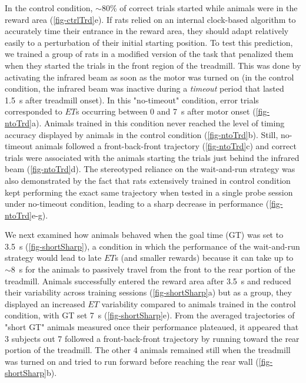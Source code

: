 
In the control condition, $\sim$80\% of correct trials started while animals were in the reward area (\autoref{fig-ctrlTrd}e).
If rats relied on an internal clock-based algorithm to accurately time their entrance in the reward area, they should adapt relatively easily to a perturbation of their initial starting position.
To test this prediction, we trained a group of rats in a modified version of the task that penalized them when they started the trials in the front region of the treadmill.
This was done by activating the infrared beam as soon as the motor was turned on (in the control condition, the infrared beam was inactive during a \textit{timeout} period that lasted 1.5~s after treadmill onset).
In this "no-timeout" condition, error trials corresponded to $ET$s occurring between 0 and 7~s after motor onset (\autoref{fig-ntoTrd}a).
Animals trained in this condition never reached the level of timing accuracy displayed by animals in the control condition (\autoref{fig-ntoTrd}b).
Still, no-timeout animals followed a front-back-front trajectory (\autoref{fig-ntoTrd}c) and correct trials were associated with the animals starting the trials just behind the infrared beam (\autoref{fig-ntoTrd}d).
The stereotyped reliance on the wait-and-run strategy was also demonstrated by the fact that rats extensively trained in control condition kept performing the exact same trajectory when tested in a single probe session under no-timeout condition, leading to a sharp decrease in performance (\autoref{fig-ntoTrd}e-g).
\par

We next examined how animals behaved when the goal time (GT) was set to 3.5~s (\autoref{fig-shortSharp}), a condition in which the performance of the wait-and-run strategy would lead to late $ET$s (and smaller rewards) because it can take up to $\sim$8~s for the animals to passively travel from the front to the rear portion of the treadmill.
Animals successfully entered the reward area after 3.5~s and reduced their variability across training sessions (\autoref{fig-shortSharp}a) but as a group, they displayed an increased $ET$ variability compared to animals trained in the control condition, with GT set 7~s (\autoref{fig-shortSharp}e).
From the averaged trajectories of "short GT" animals measured once their performance plateaued, it appeared that 3 subjects out 7 followed a front-back-front trajectory by running toward the rear portion of the treadmill.
The other 4 animals remained still when the treadmill was turned on and tried to run forward before reaching the rear wall (\autoref{fig-shortSharp}b).
